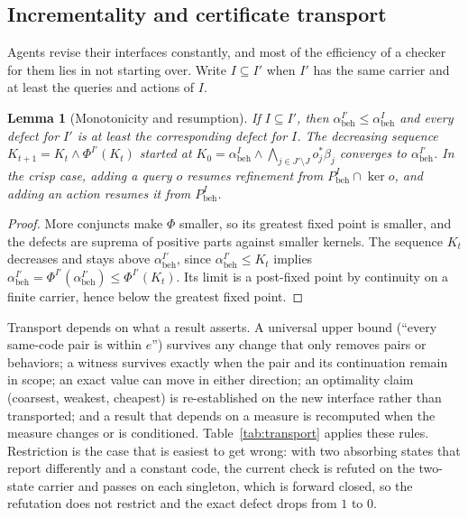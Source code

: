 \documentclass[11pt]{article}
\newcommand{\abeh}{\alpha_{\mathrm{beh}}}
\newcommand{\Pbeh}{P_{\mathrm{beh}}}
\theoremstyle{definition}
\theoremstyle{plain}
\newtheorem{lemma}[definition]{Lemma}
\begin{document}
\subsection{Incrementality and certificate transport}\label{sec:incremental}

Agents revise their interfaces constantly, and most of the efficiency of a checker for them lies
in not starting over. Write $I\subseteq I'$ when $I'$ has the same carrier and at least the
queries and actions of $I$.

\begin{lemma}[Monotonicity and resumption]\label{lem:incremental}
If $I\subseteq I'$, then $\abeh^{I'}\le\abeh^{I}$ and every defect for $I'$ is at least the
corresponding defect for $I$. The decreasing sequence $K_{t+1}=K_t\wedge\Phi^{I'}(K_t)$
started at $K_0=\abeh^{I}\wedge\bigwedge_{j\in J'\setminus J}o_j^*\beta_j$ converges to
$\abeh^{I'}$. In the crisp case, adding a query $o$ resumes refinement from $\Pbeh^{I}\cap\ker o$,
and adding an action resumes it from $\Pbeh^{I}$.
\end{lemma}

\begin{proof}
More conjuncts make $\Phi$ smaller, so its greatest fixed point is smaller, and the defects are
suprema of positive parts against smaller kernels. The sequence $K_t$ decreases and stays above
$\abeh^{I'}$, since $\abeh^{I'}\le K_t$ implies $\abeh^{I'}=\Phi^{I'}(\abeh^{I'})\le\Phi^{I'}(K_t)$.
Its limit is a post-fixed point by continuity on a finite carrier, hence below the greatest
fixed point.
\end{proof}

Transport depends on what a result asserts. A universal upper bound (``every same-code pair is
within $e$'') survives any change that only removes pairs or behaviors; a witness survives exactly
when the pair and its continuation remain in scope; an exact value can move in either direction;
an optimality claim (coarsest, weakest, cheapest) is re-established on the new interface rather
than transported; and a result that depends on a measure is recomputed when the measure changes or
is conditioned. Table~\ref{tab:transport} applies these rules. Restriction is the case that is
easiest to get wrong: with two absorbing states that report differently and a constant code, the
current check is refuted on the two-state carrier and passes on each singleton, which is forward
closed, so the refutation does not restrict and the exact defect drops from $1$ to $0$.
\end{document}
